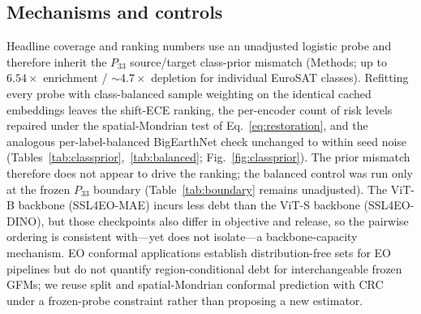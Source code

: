 \documentclass[preprint,11pt,authoryear]{elsarticle}
\begin{document}
\subsection{Mechanisms and controls}
Headline coverage and ranking numbers use an unadjusted logistic probe and therefore inherit the
$P_{33}$ source/target class-prior mismatch (Methods; up to $6.54\times$ enrichment / $\sim\!4.7\times$
depletion for individual EuroSAT classes). Refitting every probe with class-balanced sample weighting on
the identical cached embeddings leaves the shift-ECE ranking, the per-encoder count of risk levels
repaired under the spatial-Mondrian test of Eq.~\eqref{eq:restoration}, and the analogous
per-label-balanced BigEarthNet check unchanged to within seed noise
(Tables~\ref{tab:classprior},~\ref{tab:balanced}; Fig.~\ref{fig:classprior}). The prior mismatch
therefore does not appear to drive the ranking; the balanced control was run only at the frozen
$P_{33}$ boundary (Table~\ref{tab:boundary} remains unadjusted). The ViT-B backbone (SSL4EO-MAE)
incurs less debt than the ViT-S backbone (SSL4EO-DINO), but those checkpoints also differ in objective
and release, so the pairwise ordering is consistent with---yet does not isolate---a backbone-capacity
mechanism. EO conformal applications establish distribution-free sets for EO pipelines
\citep{singh2024uncertainty,lou2024geoconformal,mao2024spatial} but do not quantify region-conditional
debt for interchangeable frozen GFMs; we reuse split and spatial-Mondrian conformal prediction with
CRC \citep{vovk2005algorithmic,vovk2003mondrian,angelopoulos2024crc} under a frozen-probe constraint
rather than proposing a new estimator.
\end{document}
